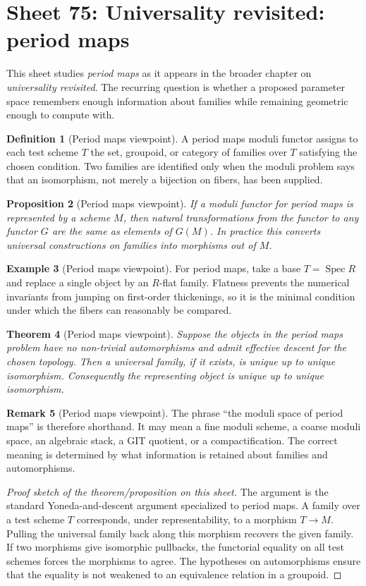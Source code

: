 \documentclass[11pt]{amsart}
\newtheorem{theorem}{Theorem}[section]
\newtheorem{proposition}[theorem]{Proposition}
\theoremstyle{definition}
\newtheorem{definition}[theorem]{Definition}
\newtheorem{example}[theorem]{Example}
\newtheorem{remark}[theorem]{Remark}
\newcommand{\Spec}{\operatorname{Spec}}
\begin{document}
\section{Sheet 75: Universality revisited: period maps}
This sheet studies \emph{period maps} as it appears in the broader chapter on \emph{universality revisited}.  The recurring question is whether a proposed parameter space remembers enough information about families while remaining geometric enough to compute with.
\begin{definition}[Period maps viewpoint]
A period maps moduli functor assigns to each test scheme $T$ the set, groupoid, or category of families over $T$ satisfying the chosen condition.  Two families are identified only when the moduli problem says that an isomorphism, not merely a bijection on fibers, has been supplied.
\end{definition}
\begin{proposition}[Period maps viewpoint]
If a moduli functor for period maps is represented by a scheme $M$, then natural transformations from the functor to any functor $G$ are the same as elements of $G(M)$.  In practice this converts universal constructions on families into morphisms out of $M$.
\end{proposition}
\begin{example}[Period maps viewpoint]
For period maps, take a base $T=\Spec R$ and replace a single object by an $R$-flat family.  Flatness prevents the numerical invariants from jumping on first-order thickenings, so it is the minimal condition under which the fibers can reasonably be compared.
\end{example}
\begin{theorem}[Period maps viewpoint]
Suppose the objects in the period maps problem have no non-trivial automorphisms and admit effective descent for the chosen topology.  Then a universal family, if it exists, is unique up to unique isomorphism.  Consequently the representing object is unique up to unique isomorphism.
\end{theorem}
\begin{remark}[Period maps viewpoint]
The phrase ``the moduli space of period maps'' is therefore shorthand.  It may mean a fine moduli scheme, a coarse moduli space, an algebraic stack, a GIT quotient, or a compactification.  The correct meaning is determined by what information is retained about families and automorphisms.
\end{remark}
\begin{proof}[Proof sketch of the theorem/proposition on this sheet]
The argument is the standard Yoneda-and-descent argument specialized to period maps.  A family over a test scheme $T$ corresponds, under representability, to a morphism $T\to M$.  Pulling the universal family back along this morphism recovers the given family.  If two morphisms give isomorphic pullbacks, the functorial equality on all test schemes forces the morphisms to agree.  The hypotheses on automorphisms ensure that the equality is not weakened to an equivalence relation in a groupoid.
\end{proof}
\end{document}
